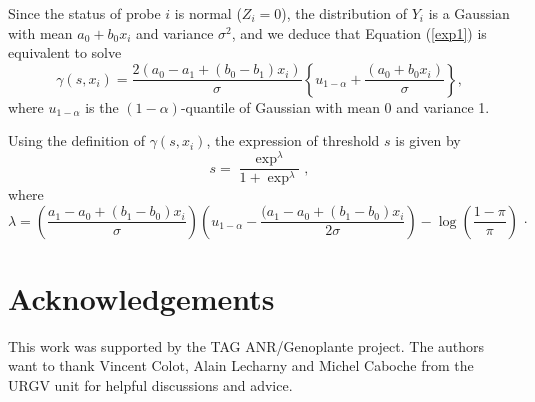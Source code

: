 \documentclass{llncs}
\begin{document}
Since the status of probe $i$ is normal ($Z_i=0$), the distribution
of $Y_i$ is a Gaussian with mean $a_0+b_0x_i$ and variance
$\sigma^2$, and we deduce that Equation (\ref{exp1}) is equivalent
to solve
$$\gamma(s, x_i) = \frac{2(a_0-a_1+(b_0-b_1)x_i)}{\sigma} \left\{u_{1-\alpha} + \frac{(a_0+b_0x_i)}{\sigma}\right\},$$  where
$u_{1-\alpha}$ is the  $(1-\alpha)$-quantile  of Gaussian with mean
0 and variance 1.

Using the definition of $\gamma(s, x_i)$, the expression of
threshold $s$ is given by
$$ s = \frac{\exp^{\lambda}}{1+\exp^{\lambda}},$$
where
$$\lambda = \left(\frac{a_1-a_0+(b_1-b_0)x_i}{\sigma}\right)
\left(u_{1-\alpha} - \frac{(a_1-a_0+(b_1-b_0)x_i}{2\sigma}\right) -
\log\left(\frac{1-\pi}{\pi}\right)\,\cdot$$

\section{Acknowledgements}

This work was supported by the TAG ANR/Genoplante project. The
authors want to thank Vincent Colot, Alain Lecharny and Michel
Caboche from the URGV unit for helpful discussions and advice.



\end{document}
